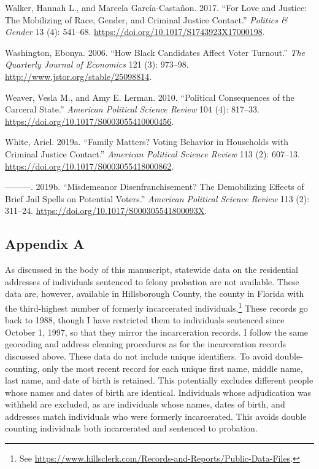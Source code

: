 \documentclass[
  12pt,
]{article}
\newlength{\cslhangindent}
\newenvironment{cslreferences}%
  {\setlength{\parindent}{0pt}%
  \everypar{\setlength{\hangindent}{\cslhangindent}}\ignorespaces}%
  {\par}
\begin{document}
\begin{cslreferences}
\leavevmode\hypertarget{ref-Walker2017}{}%
Walker, Hannah L., and Marcela García-Castañon. 2017. ``For Love and Justice: The Mobilizing of Race, Gender, and Criminal Justice Contact.'' \emph{Politics \& Gender} 13 (4): 541--68. \url{https://doi.org/10.1017/S1743923X17000198}.

\leavevmode\hypertarget{ref-Washington2006}{}%
Washington, Ebonya. 2006. ``How Black Candidates Affect Voter Turnout.'' \emph{The Quarterly Journal of Economics} 121 (3): 973--98. \url{http://www.jstor.org/stable/25098814}.

\leavevmode\hypertarget{ref-Weaver2010}{}%
Weaver, Vesla M., and Amy E. Lerman. 2010. ``Political Consequences of the Carceral State.'' \emph{American Political Science Review} 104 (4): 817--33. \url{https://doi.org/10.1017/S0003055410000456}.

\leavevmode\hypertarget{ref-White2019a}{}%
White, Ariel. 2019a. ``Family Matters? Voting Behavior in Households with Criminal Justice Contact.'' \emph{American Political Science Review} 113 (2): 607--13. \url{https://doi.org/10.1017/S0003055418000862}.

\leavevmode\hypertarget{ref-White2019}{}%
---------. 2019b. ``Misdemeanor Disenfranchisement? The Demobilizing Effects of Brief Jail Spells on Potential Voters.'' \emph{American Political Science Review} 113 (2): 311--24. \url{https://doi.org/10.1017/S000305541800093X}.
\end{cslreferences}

\newpage
{}

\hypertarget{appendix-a}{%
\subsection*{Appendix A}\label{appendix-a}}

As discussed in the body of this manuscript, statewide data on the residential addresses of individuals sentenced to felony probation are not available. These data are, however, available in Hillsborough County, the county in Florida with the third-highest number of formerly incarcerated individuals.\footnote{See \url{https://www.hillsclerk.com/Records-and-Reports/Public-Data-Files}.} These records go back to 1988, though I have restricted them to individuals sentenced since October 1, 1997, so that they mirror the incarceration records. I follow the same geocoding and address cleaning procedures as for the incarceration records discussed above. These data do not include unique identifiers. To avoid double-counting, only the most recent record for each unique first name, middle name, last name, and date of birth is retained. This potentially excludes different people whose names and dates of birth are identical. Individuals whose adjudication was withheld are excluded, as are individuals whose names, dates of birth, and addresses match individuals who were formerly incarcerated. This avoids double counting individuals both incarcerated and sentenced to probation.
\end{document}
